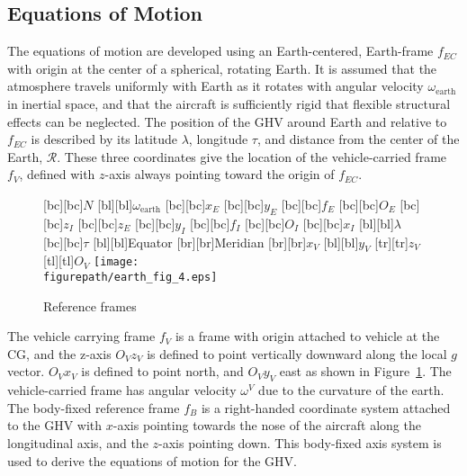 \subsection{Equations of Motion}

The equations of motion are developed using an Earth-centered, Earth-frame $f_{EC}$ with origin at the center of a spherical, rotating Earth.
It is assumed that the atmosphere travels uniformly with Earth as it rotates with angular velocity $\omega_{\text{earth}}$ in inertial space, and that the aircraft is sufficiently rigid that flexible structural effects can be neglected.
The position of the GHV around Earth and relative to $f_{EC}$ is described by its latitude $\lambda$, longitude $\tau$, and distance from the center of the Earth, $\mathscr{R}$.
These three coordinates give the location of the vehicle-carried frame $f_{V}$, defined with $z$-axis always pointing toward the origin of $f_{EC}$.

\begin{figure}[h]
  \begin{center}
    \small
    [bc][bc]{$N$}
    [bl][bl]{$\omega_{\text{earth}}$}
    [bc][bc]{$x_{E}$}
    [bc][bc]{$y_{E}$}
    [bc][bc]{$f_{E}$}
    [bc][bc]{$O_{E}$}
    [bc][bc]{$z_{I}$}
    [bc][bc]{$z_{E}$}
    [bc][bc]{$y_{I}$}
    [bc][bc]{$f_{I}$}
    [bc][bc]{$O_{I}$}
    [bc][bc]{$x_{I}$}
    [bl][bl]{$\lambda$}
    [bc][bc]{$\tau$}
    [bl][bl]{Equator}
    [br][br]{Meridian}
    [br][br]{$x_{V}$}
    [bl][bl]{$y_{V}$}
    [tr][tr]{$z_{V}$}
    [tl][tl]{$O_{V}$}
    \texttt{[image: \\figurepath/earth\_fig\_4.eps]}
    \caption{Reference frames\label{globe_fig}}
  \end{center}
\end{figure}

The vehicle carrying frame $f_{V}$ is a frame with origin attached to vehicle at the CG, and the z-axis $O_{V}z_{V}$ is defined to point vertically downward along the local $g$ vector.
$O_{V}x_{V}$ is defined to point north, and $O_{V}y_{V}$ east as shown in Figure~\ref{globe_fig}.
The vehicle-carried frame has angular velocity $\omega^{V}$ due to the curvature of the earth.
The body-fixed reference frame $f_{B}$ is a right-handed coordinate system attached to the GHV with $x$-axis pointing towards the nose of the aircraft along the longitudinal axis, and the $z$-axis pointing down.
This body-fixed axis system is used to derive the equations of motion for the GHV.\@

